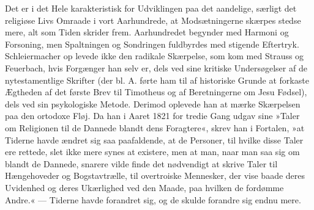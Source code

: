 \documentclass[12pt,a4paper,openany]{book}
\newcommand{\opage}[1]{\marginnote{\footnotesize\textit{[#1]}}}
\begin{document}
Det er i det Hele karakteristisk for Udviklingen paa
det aandelige, særligt det religiøse Livs Omraade i vort
Aarhundrede, at Modsætningerne skærpes stedse mere,
alt som Tiden skrider frem. Aarhundredet begynder med
Harmoni og Forsoning, men Spaltningen og Sondringen
fuldbyrdes med stigende Eftertryk. Schleiermacher op%
\opage{10}levede ikke den radikale Skærpelse, som kom med Strauss
og Feuerbach, hvis Forgænger han selv er, dels ved sine
kritiske Undersøgelser af de nytestamentlige Skrifter (der
bl. A. førte ham til af historiske Grunde at forkaste
Ægtheden af det første Brev til Timotheus og af Beretningerne
om Jesu Fødsel), dels ved sin psykologiske
Metode. Derimod oplevede han at mærke Skærpelsen
paa den ortodoxe Fløj. Da han i Aaret 1821 for tredie
Gang udgav sine »Taler om Religionen til de Dannede
blandt dens Foragtere«, skrev han i Fortalen, »at Tiderne
havde ændret sig saa paafaldende, at de Personer, til
hvilke disse Taler ere rettede, slet ikke mere synes at
existere, men at man, naar man saa sig om blandt de
Dannede, snarere vilde finde det nødvendigt at skrive
Taler til Hængehoveder og Bogstavtrælle, til overtroiske
Mennesker, der vise baade deres Uvidenhed og deres
Ukærlighed ved den Maade, paa hvilken de fordømme
Andre.« --- Tiderne havde forandret sig, og de skulde
forandre sig endnu mere.
\end{document}

